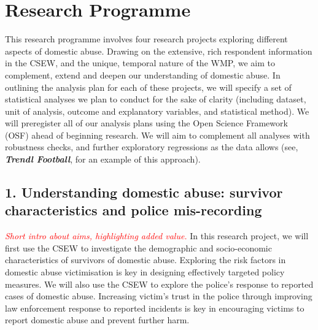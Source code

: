 \documentclass[11pt, a4paper]{article}
\begin{document}
\newpage

\section*{Research Programme}

This research programme involves four research projects exploring different aspects of domestic abuse. Drawing on the extensive, rich respondent information in the CSEW, and the unique, temporal nature of the WMP, we aim to complement, extend and deepen our understanding of domestic abuse. In outlining the analysis plan for each of these projects, we will specify a set of statistical analyses we plan to conduct for the sake of clarity (including dataset, unit of analysis, outcome and explanatory variables, and statistical method). We will preregister all of our analysis plans using the Open Science Framework (OSF) ahead of beginning research. We will aim to complement all analyses with robustness checks, and further exploratory regressions as the data allows (see, \textbf{\textit{Trendl Football}}, for an example of this approach).

\subsection*{1. Understanding domestic abuse: survivor characteristics and police mis-recording}

 \textcolor{red}{\textit{Short intro about aims, highlighting added value.}}
In this research project, we will first use the CSEW to investigate the demographic and socio-economic characteristics of survivors of domestic abuse. Exploring the risk factors in domestic abuse victimisation is key in designing effectively targeted policy measures. We will also use the CSEW to explore the police's response to reported cases of domestic abuse. Increasing victim's trust in the police through improving law enforcement response to reported incidents is key in encouraging victims to report domestic abuse and prevent further harm.

\end{document}
